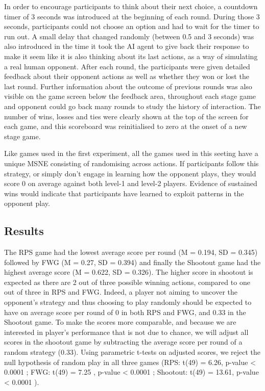 \documentclass[man,floatsintext]{apa6}
\begin{document}
In order to encourage participants to think about their next choice, a countdown timer of 3 seconds was introduced at the beginning of each round. During those 3 seconds, participants could not choose an option and had to wait for the timer to run out. A small delay that changed randomly (between 0.5 and 3 seconds) was also introduced in the time it took the AI agent to give back their response to make it seem like it is also thinking about its last actions, as a way of simulating a real human opponent. After each round, the participants were given detailed feedback about their opponent actions as well as whether they won or lost the last round. Further information about the outcome of previous rounds was also visible on the game screen below the feedback area, throughout each stage game and opponent could go back many rounds to study the history of interaction. The number of wins, losses and ties were clearly shown at the top of the screen for each game, and this scoreboard was reinitialised to zero at the onset of a new stage game.

Like games used in the first experiment, all the games used in this seeting have a unique MSNE consisting of randomising across actions. If participants follow this strategy, or simply don't engage in learning how the opponent plays, they would score 0 on average against both level-1 and level-2 players. Evidence of sustained wins would indicate that participants have learned to exploit patterns in the opponent play.

\hypertarget{results-1}{%
\subsection{Results}\label{results-1}}

The RPS game had the lowest average score per round (M = 0.194, SD = 0.345) followed by FWG (M = 0.27, SD = 0.394) and finally the Shootout game had the highest average score (M = 0.622, SD = 0.326). The higher score in shootout is expected as there are 2 out of three possible winning actions, compared to one out of three in RPS and FWG. Indeed, a player not aiming to uncover the opponent's strategy and thus choosing to play randomly should be expected to have on average score per round of 0 in both RPS and FWG, and 0.33 in the Shootout game. To make the scores more comparable, and because we are interested in player's performance that is not due to chance, we will adjust all scores in the shootout game by subtracting the average score per round of a random strategy (0.33). Using parametric t-tests on adjusted scores, we reject the null hypothesis of random play in all three games (RPS: t(49) = 6.26, p-value \textless{} 0.0001 ; FWG: t(49) = 7.25 , p-value \textless{} 0.0001 ; Shootout: t(49) = 13.61, p-value \textless{} 0.0001 ).
\end{document}
